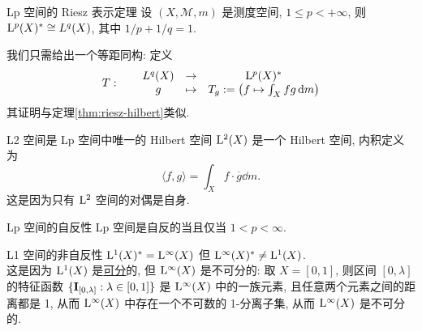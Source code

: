         \begin{thm}
            {Lp 空间的 Riesz 表示定理}
            设 \((X, \mathcal{M}, m)\) 是测度空间, \(1\leq p < +\infty\), 则 \(\Lp(X)^* \cong L^q(X)\), 其中 \(1/p+1/q=1\). 
        \end{thm}

        \begin{prf}
            我们只需给出一个等距同构:
            定义
            \[T:\qquad\begin{matrix}
                L^q(X) & \to & \Lp(X)^*\\
                g & \mapsto & T_g:=\qty(f\mapsto\int_X fg \dd{m})
            \end{matrix}\]
            其证明与定理\ref{thm:riesz-hilbert}类似.
        \end{prf}

        \begin{ins}
            {L2 空间是 Lp 空间中唯一的 Hilbert 空间}
            \(\Lp[2](X)\) 是一个 Hilbert 空间, 内积定义为
            \[\langle f, g\rangle = \int_X f\cdot\overline{g} \dd{m}.\]
            这是因为只有 \(\Lp[2]\) 空间的对偶是自身.
        \end{ins}

        \begin{thm}
            {Lp 空间的自反性}
            Lp 空间是自反的当且仅当 \(1<p<\infty\).
        \end{thm}

        \begin{cxmp}
            {L1 空间的非自反性}
            \(\Lp[1](X)^*=\Lp[\infty](X)\) 但 \(\Lp[\infty](X)^* \neq \Lp[1](X)\). \\
            这是因为 \(\Lp[1](X)\) 是\hyperref[dfn:separable]{可分}的, 但 \(\Lp[\infty](X)\) 是不可分的: 取 \(X=[0,1]\), 则区间 \([0,\lambda]\) 的特征函数 \(\{\operatorname{\mathbf{I}}_{[0,\lambda]}: \lambda\in[0,1]\}\) 是 \(\Lp[\infty](X)\) 中的一族元素, 且任意两个元素之间的距离都是 1, 从而 \(\Lp[\infty](X)\) 中存在一个不可数的 1-分离子集, 从而 \(\Lp[\infty](X)\) 是不可分的.
        \end{cxmp}


